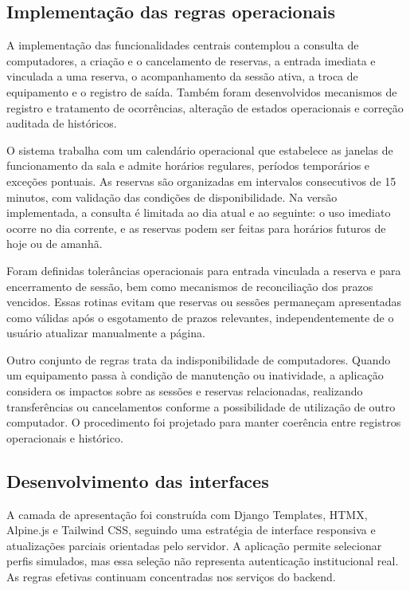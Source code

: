 \subsection{Implementação das regras operacionais}

A implementação das funcionalidades centrais contemplou a consulta de computadores, a criação e o cancelamento de reservas, a entrada imediata e vinculada a uma reserva, o acompanhamento da sessão ativa, a troca de equipamento e o registro de saída. Também foram desenvolvidos mecanismos de registro e tratamento de ocorrências, alteração de estados operacionais e correção auditada de históricos.

O sistema trabalha com um calendário operacional que estabelece as janelas de funcionamento da sala e admite horários regulares, períodos temporários e exceções pontuais. As reservas são organizadas em intervalos consecutivos de 15 minutos, com validação das condições de disponibilidade. Na versão implementada, a consulta é limitada ao dia atual e ao seguinte: o uso imediato ocorre no dia corrente, e as reservas podem ser feitas para horários futuros de hoje ou de amanhã.

Foram definidas tolerâncias operacionais para entrada vinculada a reserva e para encerramento de sessão, bem como mecanismos de reconciliação dos prazos vencidos. Essas rotinas evitam que reservas ou sessões permaneçam apresentadas como válidas após o esgotamento de prazos relevantes, independentemente de o usuário atualizar manualmente a página.

Outro conjunto de regras trata da indisponibilidade de computadores. Quando um equipamento passa à condição de manutenção ou inatividade, a aplicação considera os impactos sobre as sessões e reservas relacionadas, realizando transferências ou cancelamentos conforme a possibilidade de utilização de outro computador. O procedimento foi projetado para manter coerência entre registros operacionais e histórico.

\subsection{Desenvolvimento das interfaces}

A camada de apresentação foi construída com Django Templates, HTMX, Alpine.js e Tailwind CSS, seguindo uma estratégia de interface responsiva e atualizações parciais orientadas pelo servidor. A aplicação permite selecionar perfis simulados, mas essa seleção não representa autenticação institucional real. As regras efetivas continuam concentradas nos serviços do backend.

